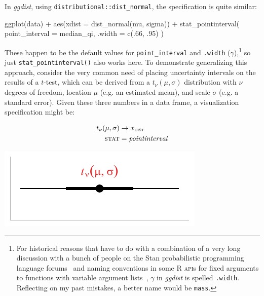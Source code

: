 \documentclass[journal]{vgtc}              %
\newenvironment{centerverbatim}{%
  \hfill\break
  \small
  \centering
  \varwidth{\linewidth}%
  \verbatim
}{%
  \endverbatim
  \endvarwidth
  \par
  \hfill\break
}
\begin{document}
In \textit{ggdist}, using \texttt{distributional::dist\_normal}, the specification is quite similar:

\begin{centerverbatim}
ggplot(data) +
  aes(xdist = dist_normal(mu, sigma)) +
  stat_pointinterval(
    point_interval = median_qi, 
    .width = c(.66, .95)
  )
\end{centerverbatim}

These happen to be the default values for \texttt{point\_interval} and \texttt{.width} ($\gamma$),\footnote{For historical reasons that have to do with a combination of a very long discussion with a bunch of people on the Stan probabilistic programming language forums~\cite{kay2018stannames} and naming conventions in some R \textsc{api}s for fixed arguments to functions with variable argument lists~\cite{tidyverse2020dotprefix}, $\gamma$ in \textit{ggdist} is spelled \texttt{.width}. Reflecting on my past mistakes, a better name would be  \texttt{mass}.} so just \texttt{stat\_pointinterval()}  also works here. To demonstrate generalizing this approach, consider the very common need of placing uncertainty intervals on the results of a $t$-test, which can be derived from a $t_\nu(\mu, \sigma)$  distribution with $\nu$ degrees of freedom, location $\mu$ (e.g. an estimated mean), and scale $\sigma$ (e.g. a standard error). Given these three numbers in a data frame, a visualization specification might be:

\noindent
\begin{minipage}{.5\columnwidth}

\begin{align*}
t_{\nu}(\mu, \sigma) &\rightarrow x_\textsc{dist}\\
\textsc{stat} &= \mathit{pointinterval}
\end{align*}
\end{minipage}%
  \begin{minipage}{.4\columnwidth}
    \centering
    \includegraphics[width=1.2\columnwidth]{figs/3-stat_pointinterval_student_t.pdf}
  \end{minipage}
\hfill\break
\end{document}
